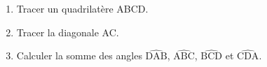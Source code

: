 \documentclass[exercice]{thedocument}%
\begin{document}
%
\begin{enumerate}
    \item Tracer un quadrilatère ABCD.
    \item Tracer la diagonale AC.
    \item Calculer la somme des angles $\widehat{\text{DAB}}$,
    $\widehat{\text{ABC}}$, $\widehat{\text{BCD}}$ et $\widehat{\text{CDA}}$.
\end{enumerate}
\end{document}

